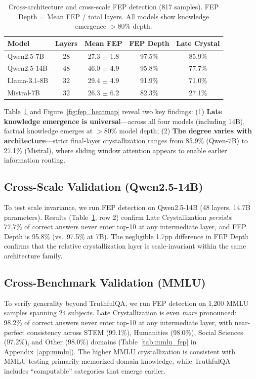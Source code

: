 \documentclass{article}
\begin{document}
\begin{table}[t]
\centering
\small
\begin{tabular}{lcccc}
\toprule
\textbf{Model} & \textbf{Layers} & \textbf{Mean FEP} & \textbf{FEP Depth} & \textbf{Late Crystal} \\
\midrule
Qwen2.5-7B & 28 & 27.3 $\pm$ 1.8 & 97.5\% & 85.9\% \\
Qwen2.5-14B & 48 & 46.0 $\pm$ 4.9 & 95.8\% & 77.7\% \\
Llama-3.1-8B & 32 & 29.4 $\pm$ 4.9 & 91.9\% & 71.0\% \\
Mistral-7B & 32 & 26.3 $\pm$ 6.2 & 82.3\% & 27.1\% \\
\bottomrule
\end{tabular}
\caption{Cross-architecture and cross-scale FEP detection (817 samples). FEP Depth = Mean FEP / total layers. All models show knowledge emergence $>$80\% depth.}
\label{tab:cross_fep}
\end{table}

Table~\ref{tab:cross_fep} and Figure~\ref{fig:fep_heatmap} reveal two key findings: (1) \textbf{Late knowledge emergence is universal}---across all four models (including 14B), factual knowledge emerges at $>$80\% model depth; (2) \textbf{The degree varies with architecture}---strict final-layer crystallization ranges from 85.9\% (Qwen-7B) to 27.1\% (Mistral), where sliding window attention appears to enable earlier information routing.

\subsection{Cross-Scale Validation (Qwen2.5-14B)}
\label{sec:scale}

To test scale invariance, we run FEP detection on Qwen2.5-14B (48 layers, 14.7B parameters). Results (Table~\ref{tab:cross_fep}, row 2) confirm Late Crystallization \emph{persists}: 77.7\% of correct answers never enter top-10 at any intermediate layer, and FEP Depth is 95.8\% (vs.\ 97.5\% at 7B). The negligible 1.7pp difference in FEP Depth confirms that the relative crystallization layer is scale-invariant within the same architecture family.

\subsection{Cross-Benchmark Validation (MMLU)}
\label{sec:mmlu}

To verify generality beyond TruthfulQA, we run FEP detection on 1{,}200 MMLU samples spanning 24 subjects. Late Crystallization is even \emph{more} pronounced: 98.2\% of correct answers never enter top-10 at any intermediate layer, with near-perfect consistency across STEM (99.1\%), Humanities (98.0\%), Social Sciences (97.2\%), and Other (98.0\%) domains (Table~\ref{tab:mmlu_fep} in Appendix~\ref{app:mmlu}). The higher MMLU crystallization is consistent with MMLU testing primarily memorized domain knowledge, while TruthfulQA includes ``computable'' categories that emerge earlier.
\end{document}
